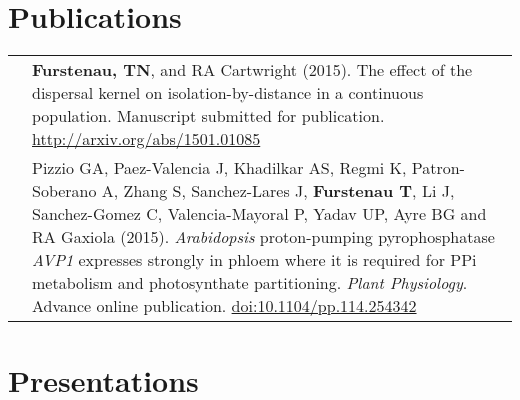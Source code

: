 \documentclass[11pt]{article}
\begin{document}
\section*{Publications}
\renewcommand{\arraystretch}{1.5}
\begin{tabularx}{\linewidth}{l X}
&\textbf{Furstenau, TN}, and RA Cartwright (2015). The effect of the dispersal kernel on isolation-by-distance in a continuous population. Manuscript submitted for publication. \href{http://arxiv.org/abs/1501.01085}{http://arxiv.org/abs/1501.01085}\\
&Pizzio GA, Paez-Valencia J, Khadilkar AS, Regmi K, Patron-Soberano A, Zhang S, Sanchez-Lares J, \textbf{Furstenau T}, Li J, Sanchez-Gomez C, Valencia-Mayoral P, Yadav UP, Ayre BG and RA Gaxiola (2015).\textit{ Arabidopsis} proton-pumping pyrophosphatase \textit{AVP1} expresses strongly in phloem where it is required for PPi metabolism and photosynthate partitioning. \textit{Plant Physiology}. Advance online publication. \href{http:/​/​dx.​doi.​org/​10.​1104/​pp.​114.​254342}{doi:10.1104/pp.114.254342}\\
\end{tabularx}
\section*{Presentations}
\end{document}
